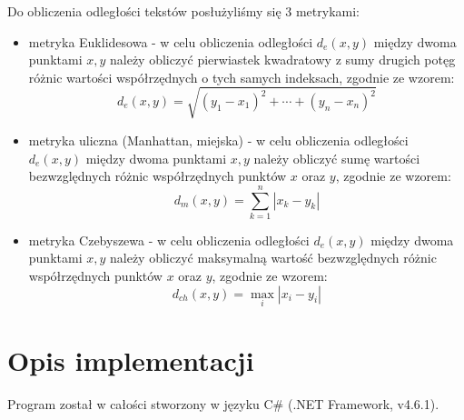 \documentclass{classrep}
\begin{document}
Do obliczenia odległości tekstów posłużyliśmy się 3 metrykami: \newline

\begin{itemize}[label=$\bullet$]
\item metryka Euklidesowa - w celu obliczenia odległości $ d_{e}(x,y) $ między dwoma punktami $ x, y $ należy obliczyć pierwiastek kwadratowy z sumy drugich potęg różnic wartości współrzędnych o tych samych indeksach, zgodnie ze wzorem:
$$
d_{e}(x,y)= \sqrt{ (y_{1} - x_{1})^2 + \cdots + (y_{n} - x_{n})^2 }
$$

\item metryka uliczna (Manhattan, miejska) - w celu obliczenia odległości $ d_{e}(x,y) $ między dwoma punktami $ x, y $ należy obliczyć sumę wartości bezwzględnych różnic współrzędnych punktów $ x $ oraz $ y $, zgodnie ze wzorem:
$$
d_{m}(x,y)= \sum_{k=1}^{n} | x_{k} - y_{k} |
$$

\item metryka Czebyszewa - w celu obliczenia odległości $ d_{e}(x,y) $ między dwoma punktami $ x, y $ należy obliczyć maksymalną wartość bezwzględnych różnic współrzędnych punktów $ x $ oraz $ y $, zgodnie ze wzorem:
$$
d_{ch}(x,y)= \max_{i} |x_{i} - y_{i}|
$$
\newline
\end{itemize}

\section{Opis implementacji}
Program został w całości stworzony w języku C\# (.NET Framework, v4.6.1). 
\end{document}
